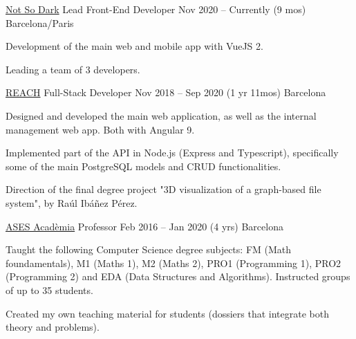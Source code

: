 

\begin{cventries}

  \cventry
    {\href{https://getquokka.app/}{Not So Dark}} %
    {Lead Front-End Developer} %
    {Nov 2020 – Currently (9 mos)} %
    {Barcelona/Paris} %
    {
      \begin{cvitems} %
        \item {Development of the main web and mobile app with VueJS 2.}
        \item {Leading a team of 3 developers.}
      \end{cvitems}
    }

  \cventry
    {\href{https://www.myreach.io}{REACH}} %
    {Full-Stack Developer} %
    {Nov 2018 – Sep 2020 (1 yr 11mos)} %
    {Barcelona} %
    {
      \begin{cvitems} %
        \item {Designed and developed the main web application, as well as the internal management web app. Both with Angular 9.}
        \item {Implemented part of the API in Node.js (Express and Typescript), specifically some of the main PostgreSQL models and CRUD functionalities.}
        \item {Direction of the final degree project "3D visualization of a graph-based file system", by Raúl Ibáñez Pérez.}
      \end{cvitems}
    }

  \cventry
    {\href{https://www.asesacademia.com}{ASES Acadèmia}} %
    {Professor} %
    {Feb 2016 – Jan 2020 (4 yrs)} %
    {Barcelona} %
    {
      \begin{cvitems} %
        \item {Taught the following Computer Science degree subjects: FM (Math foundamentals), M1 (Maths 1), M2 (Maths 2), PRO1 (Programming 1), PRO2 (Programming 2) and EDA (Data Structures and Algorithms). Instructed groups of up to 35 students.}
        \item {Created my own teaching material for students (dossiers that integrate both theory and problems).}
      \end{cvitems}
    }


\end{cventries}
